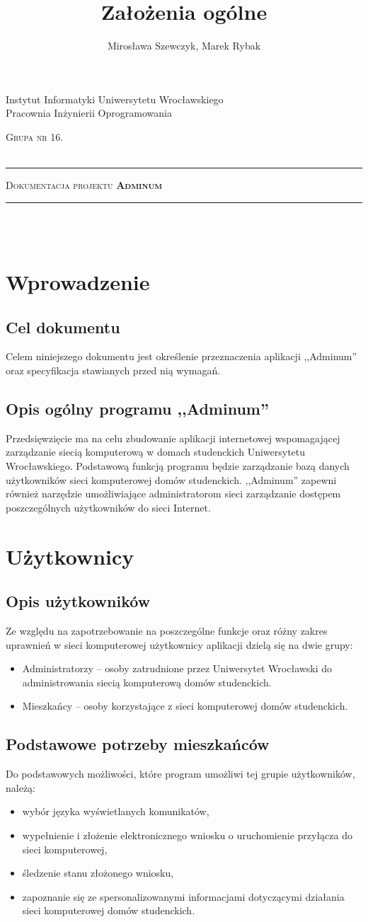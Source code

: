 \documentclass[12pt,a4paper,notitlepage]{article}
\author{Mirosława Szewczyk, Marek Rybak}
\title{Założenia ogólne}
\makeatletter
\newcommand{\linia}{\rule{\linewidth}{0.4mm}}
\renewcommand{\maketitle}{\begin{titlepage}
    \vspace*{2cm}
    \begin{center}\small        
        Instytut Informatyki Uniwersytetu Wrocławskiego\\
        Pracownia Inżynierii Oprogramowania\\
  \vspace{2cm}
       
      \normalsize \textsc{ Grupa nr 16.}\\
        \normalsize \textsc{\@author}\\
\end{center}
    \vspace{3cm}
    \noindent\linia
    \begin{center}
        \LARGE \textsc{Dokumentacja projektu \textbf{Adminum}}\\       
        \linia
        \vspace{2cm}
        \LARGE \textsc{\@title}\\
      
        \vspace{1.5cm}
       \normalsize \@date\\




    \end{center}
  \end{titlepage}
}
\makeatother
\begin{document}
    \maketitle
\setcounter{page}{2}
    \tableofcontents
    \newpage
    \section{Wprowadzenie}
	\subsection{Cel dokumentu}
	Celem niniejszego dokumentu jest określenie przeznaczenia aplikacji ,,Adminum'' oraz specyfikacja stawianych przed nią wymagań.
	\subsection{Opis ogólny programu ,,Adminum''}
	Przedsięwzięcie ma na celu zbudowanie aplikacji internetowej wspomagającej zarządzanie siecią komputerową w domach studenckich Uniwersytetu Wrocławskiego. Podstawową funkcją programu będzie zarządzanie bazą danych użytkowników sieci komputerowej domów studenckich. ,,Adminum'' zapewni również narzędzie umożliwiające administratorom sieci zarządzanie dostępem poszczególnych użytkowników do sieci Internet.
    \section{Użytkownicy}
	\subsection{Opis użytkowników}
	Ze względu na zapotrzebowanie na poszczególne funkcje oraz różny zakres uprawnień w sieci komputerowej użytkownicy aplikacji dzielą się na dwie grupy:
	\begin{itemize}
		\item Administratorzy -- osoby zatrudnione przez Uniwersytet Wrocławski do administrowania siecią komputerową domów studenckich.
		\item Mieszkańcy -- osoby korzystające z sieci komputerowej domów studenckich. 
	\end{itemize}
	\subsection{Podstawowe potrzeby mieszkańców}
	Do podstawowych możliwości, które program umożliwi tej grupie użytkowników, należą:
	\begin{itemize}
		\item wybór języka wyświetlanych komunikatów,
		\item wypełnienie i złożenie elektronicznego wniosku o uruchomienie przyłącza do sieci komputerowej,
		\item śledzenie stanu złożonego wniosku,
		\item zapoznanie się ze spersonalizowanymi informacjami dotyczącymi działania sieci komputerowej domów studenckich.
	\end{itemize}
\end{document}
